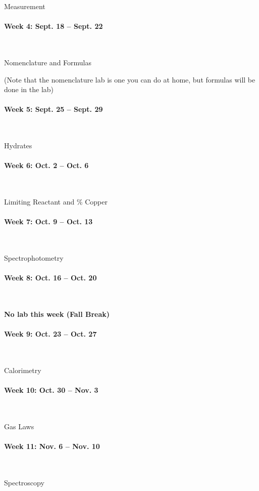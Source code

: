 \documentclass[12pt, letterpaper]{article}
\begin{document}
Measurement

\paragraph{Week 4: Sept. 18 -- Sept. 22}~

Nomenclature and Formulas

(Note that the nomenclature lab is one you can do at home, but formulas will be done in the lab)

\paragraph{Week 5: Sept. 25 -- Sept. 29}~

Hydrates

\paragraph{Week 6: Oct. 2 -- Oct. 6}~

Limiting Reactant and \% Copper

\paragraph{Week 7: Oct. 9 -- Oct. 13}~

Spectrophotometry

\paragraph{Week 8: Oct. 16 -- Oct. 20}~

\textbf{No lab this week (Fall Break)}

\paragraph{Week 9: Oct. 23 -- Oct. 27}~

Calorimetry

\paragraph{Week 10: Oct. 30 -- Nov. 3}~

Gas Laws

\paragraph{Week 11: Nov. 6 -- Nov. 10}~

Spectroscopy
\end{document}
